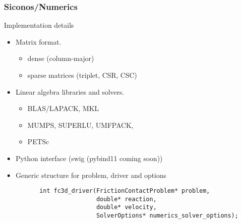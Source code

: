 \begin{frame}[fragile]
  \frametitle{Siconos/Numerics}
  \begin{block}
    {Implementation details}
     \begin{itemize}
     \item Matrix format.
       \begin{itemize}
       \item dense (column-major)
       \item sparse matrices (triplet, CSR, CSC)
       \end{itemize}
     \item Linear algebra libraries and solvers.
       \begin{itemize}
       \item BLAS/LAPACK, MKL
       \item MUMPS, SUPERLU, UMFPACK,
       \item PETSc
       \end{itemize}
     \item Python interface (swig (pybind11 coming soon))
     \item Generic structure for problem, driver and options
     \end{itemize}
   \end{block}
        {\small
        \begin{verbatim}
          int fc3d_driver(FrictionContactProblem* problem,
                          double* reaction,
                          double* velocity,
                          SolverOptions* numerics_solver_options);
       \end{verbatim}
     }
\end{frame}




